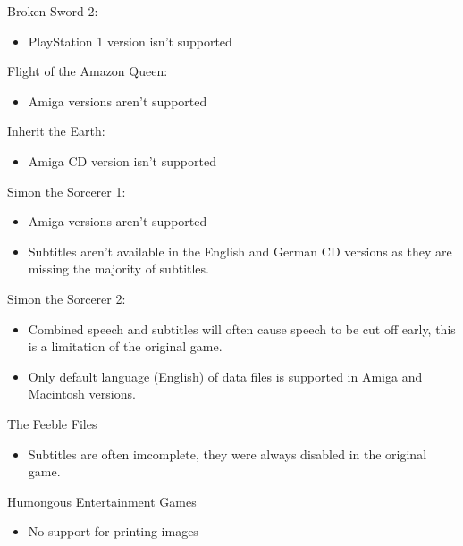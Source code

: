 Broken Sword 2:
  \begin{itemize}
  \item PlayStation 1 version isn't supported
  \end{itemize}
Flight of the Amazon Queen:
  \begin{itemize}
  \item Amiga versions aren't supported
  \end{itemize}
Inherit the Earth:
  \begin{itemize}
  \item Amiga CD version isn't supported
  \end{itemize}
Simon the Sorcerer 1:
  \begin{itemize}
  \item Amiga versions aren't supported
  \item Subtitles aren't available in the English and German CD versions
            as they are missing the majority of subtitles.
  \end{itemize}
Simon the Sorcerer 2:
  \begin{itemize}
  \item Combined speech and subtitles will often cause speech to be
            cut off early, this is a limitation of the original game.
  \item Only default language (English) of data files is supported
            in Amiga and Macintosh versions.
  \end{itemize}
The Feeble Files
  \begin{itemize}
  \item Subtitles are often imcomplete, they were always disabled in the
            original game.
  \end{itemize}
Humongous Entertainment Games
  \begin{itemize}
  \item No support for printing images
  \end{itemize}

